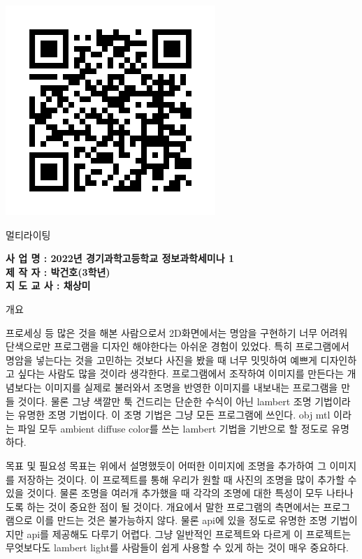 \documentclass[a0paper,portrait]{baposter}
\begin{document}
\begin{poster}
{ 
  \includegraphics[height=0.65\headerheight]{./logo/youtube.png}

}
{\color{black}\LARGE
 멀티라이팅 
}
{\color{black}\small
  \vspace{0.2em} 
  \begin{flushright}
  \normalsize{
  \textbf{
  사   업   명 : 2022년 경기과학고등학교 정보과학세미나 1\\[0.2em]
  제   작   자 : 박건호(3학년)\\[0.2em]
  지 도 교 사 : 채상미 }}
  \end{flushright}
}


\begin{posterbox}[name=intro,span=2, column=0,row=0, ]{개요}

  프로세싱 등 많은 것을 해본 사람으로서 2D화면에서는 명암을 구현하기 너무 어려워 단색으로만 프로그램을 디자인 해야한다는 아쉬운 경험이 있었다. 특히 프로그램에서 명암을 넣는다는 것을 고민하는 것보다 사진을 봤을 때 너무 밋밋하여 예쁘게 디자인하고 싶다는 사람도 많을 것이라 생각한다. 프로그램에서 조작하여 이미지를 만든다는 개념보다는 이미지를 실제로 불러와서 조명을 반영한 이미지를 내보내는 프로그램을 만들 것이다.
  물론 그냥 색깔만 툭 건드리는 단순한 수식이 아닌 lambert 조명 기법이라는 유명한 조명 기법이다. 이 조명 기법은 그냥 모든 프로그램에 쓰인다. obj mtl 이라는 파일 모두 ambient diffuse color를 쓰는 lambert 기법을 기반으로 할 정도로 유명하다. 
\end{posterbox}

\begin{posterbox}[name=usage,column=0,below=intro]{목표 및 필요성}
  목표는 위에서 설명했듯이 어떠한 이미지에 조명을 추가하여 그 이미지를 저장하는 것이다. 이 프로젝트를 통해 우리가 원할 때 사진의 조명을 많이 추가할 수 있을 것이다. 물론 조명을 여러개 추가했을 때 각각의 조명에 대한 특성이 모두 나타나도록 하는 것이 중요한 점이 될 것이다.
  개요에서 말한 프로그램의 측면에서는 프로그램으로 이를 만드는 것은 불가능하지 않다. 물론 api에 있을 정도로 유명한 조명 기법이지만 api를 제공해도 다루기 어렵다. 그냥 일반적인 프로젝트와 다르게 이 프로젝트는 무엇보다도 lambert light를 사람들이 쉽게 사용할 수 있게 하는 것이 매우 중요하다.
\end{posterbox}


\end{poster}
\end{document}
